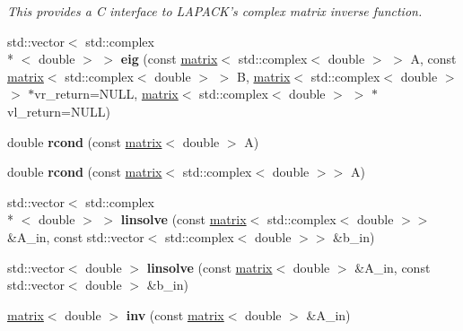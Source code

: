 \begin{DoxyCompactItemize}
\begin{DoxyCompactList}\small\item\em This provides a C interface to L\-A\-P\-A\-C\-K's complex matrix inverse function. \end{DoxyCompactList}\item 
\hypertarget{namespacekeycpp_a6aca656320e1b26861469a979a96066f}{std\-::vector$<$ std\-::complex\\*
$<$ double $>$ $>$ {\bfseries eig} (const \hyperlink{classkeycpp_1_1matrix}{matrix}$<$ std\-::complex$<$ double $>$ $>$ A, const \hyperlink{classkeycpp_1_1matrix}{matrix}$<$ std\-::complex$<$ double $>$ $>$ B, \hyperlink{classkeycpp_1_1matrix}{matrix}$<$ std\-::complex$<$ double $>$ $>$ $\ast$vr\-\_\-return=N\-U\-L\-L, \hyperlink{classkeycpp_1_1matrix}{matrix}$<$ std\-::complex$<$ double $>$ $>$ $\ast$vl\-\_\-return=N\-U\-L\-L)}\label{namespacekeycpp_a6aca656320e1b26861469a979a96066f}

\item 
\hypertarget{namespacekeycpp_a08b7545ff5c1295647680d08f2953875}{double {\bfseries rcond} (const \hyperlink{classkeycpp_1_1matrix}{matrix}$<$ double $>$ A)}\label{namespacekeycpp_a08b7545ff5c1295647680d08f2953875}

\item 
\hypertarget{namespacekeycpp_a5cc586899ece36154e39201f18e6db55}{double {\bfseries rcond} (const \hyperlink{classkeycpp_1_1matrix}{matrix}$<$ std\-::complex$<$ double $>$$>$ A)}\label{namespacekeycpp_a5cc586899ece36154e39201f18e6db55}

\item 
\hypertarget{namespacekeycpp_a9f68b3d9143ad3582e59dd0a4b1998b8}{std\-::vector$<$ std\-::complex\\*
$<$ double $>$ $>$ {\bfseries linsolve} (const \hyperlink{classkeycpp_1_1matrix}{matrix}$<$ std\-::complex$<$ double $>$$>$ \&A\-\_\-in, const std\-::vector$<$ std\-::complex$<$ double $>$$>$ \&b\-\_\-in)}\label{namespacekeycpp_a9f68b3d9143ad3582e59dd0a4b1998b8}

\item 
\hypertarget{namespacekeycpp_a46f4a25648e5bad1cf0bd0e7fca7fae0}{std\-::vector$<$ double $>$ {\bfseries linsolve} (const \hyperlink{classkeycpp_1_1matrix}{matrix}$<$ double $>$ \&A\-\_\-in, const std\-::vector$<$ double $>$ \&b\-\_\-in)}\label{namespacekeycpp_a46f4a25648e5bad1cf0bd0e7fca7fae0}

\item 
\hypertarget{namespacekeycpp_adc96927cda2df7a6e8e2031941c43601}{\hyperlink{classkeycpp_1_1matrix}{matrix}$<$ double $>$ {\bfseries inv} (const \hyperlink{classkeycpp_1_1matrix}{matrix}$<$ double $>$ \&A\-\_\-in)}\label{namespacekeycpp_adc96927cda2df7a6e8e2031941c43601}


\end{DoxyCompactItemize}
